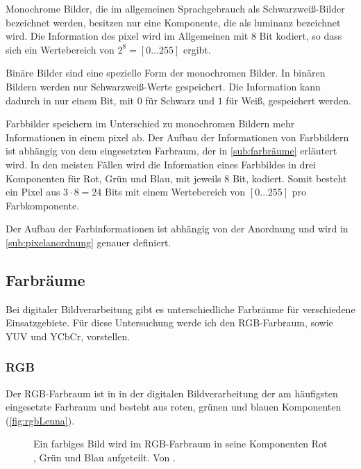 Monochrome Bilder, die im allgemeinen Sprachgebrauch als Schwarzweiß-Bilder bezeichnet werden, besitzen nur eine
 Komponente, die als \gls{luminanz} bezeichnet wird. Die Information des \gls{pixel} wird im Allgemeinen
 mit 8 Bit kodiert, so dass sich ein Wertebereich von $2^8 = \left[0\dotsc255\right]$ ergibt.

Binäre Bilder sind eine spezielle Form der monochromen Bilder. In binären Bildern werden nur Schwarzweiß-Werte
 gespeichert. Die Information kann dadurch in nur einem Bit, mit $0$ für Schwarz und $1$ für Weiß, gespeichert werden.

Farbbilder speichern im Unterschied zu monochromen Bildern mehr Informationen in einem \gls{pixel} ab. Der Aufbau der
Informationen von Farbbildern ist abhängig von dem eingesetzten Farbraum, der in \autoref{sub:farbräume} erläutert
wird. In den meisten Fällen wird die Information eines Farbbildes in drei Komponenten für Rot, Grün und Blau, mit
jeweils 8 Bit, kodiert. Somit besteht ein Pixel aus \(3 \cdot 8 = 24\) Bits mit einem Wertebereich von
\(\left[0 \dotsc 255\right]\) pro Farbkomponente.

Der Aufbau der Farbinformationen ist abhängig von der Anordnung und wird in \autoref{sub:pixelanordnung} genauer
 definiert.


\subsection{Farbräume} %
\label{sub:farbräume}

Bei digitaler Bildverarbeitung gibt es unterschiedliche Farbräume für verschiedene Einsatzgebiete. Für diese
 Untersuchung werde ich den RGB-Farbraum, sowie YUV und YCbCr, vorstellen.

\subsubsection{RGB} %
\label{sec:rgb}

Der RGB-Farbraum ist in in der digitalen Bildverarbeitung der am häufigsten eingesetzte Farbraum und besteht aus roten,
 grünen und blauen Komponenten (\autoref{fig:rgbLenna}).
\begin{figure}[!ht]
	\centering
	\caption{Ein farbiges Bild  wird im RGB-Farbraum in seine Komponenten Rot
		 , Grün  und Blau  aufgeteilt.
		Von \cite{lenna}.
	}
	\label{fig:rgbLenna}
\end{figure}

